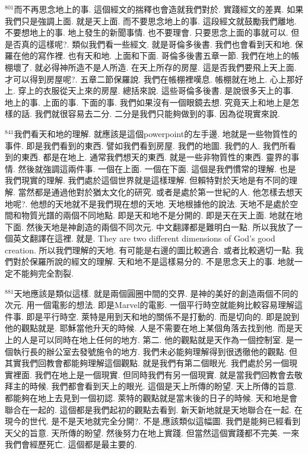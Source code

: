 \documentclass{book}
\begin{document}
$^{801}$而不再思念地上的事.
這個經文的揣釋也會造就我們對於.
實踐經文的差異.
如果我們只是強調上面.
就是天上面.
而不要思念地上的事.
這段經文就鼓勵我們離地.
不要想地上的事.
地上發生的新聞事情.
也不要理會.
只要思念上面的事就可以.
但是否真的這樣呢?.
類似我們看一些經文.
就是哥倫多後書.
我們也會看到天和地.
保羅在他的寫作裡.
也有天和地.
上面和下面.
哥倫多後書五章一節.
我們在地上的帳棚壞了.
就必得神所造不是人所造.
在天上所存的房屋.
這是否我們要飛上天上面.
才可以得到房屋呢?.
五章二節保羅說.
我們在帳棚裡嘆息.
帳棚就在地上.
心上那好上.
穿上的衣服從天上來的房屋.
總括來說.
這些哥倫多後書.
是說很多天上的事.
地上的事.
上面的事.
下面的事.
我們如果沒有一個眼鏡去想.
究竟天上和地上是怎樣的話.
我們就很容易去二分.
二分是我們只能夠做到的事.
因為從現實來說.

$^{841}$我們看天和地的理解.
就應該是這個powerpoint的左手邊.
地就是一些物質性的事件.
即是我們看到的東西.
譬如我們看到房屋.
我們的地圖.
我們的人.
我們所看到的東西.
都是在地上.
通常我們想天的東西.
就是一些非物質性的東西.
靈界的事情.
然後就強調這兩件事.
一個在上面.
一個在下面.
這個是我們慣常的理解.
也是我們現實的理解.
我們處於這個世界就是這樣理解.
但賴特對於天地是有不同的理解.
當然都是通過他對於猶太文化的研究.
或者是處於第一世紀的人.
他怎樣去想天地呢?.
他想的天地就不是我們現在想的天地.
天地根據他的說法.
天地不是處於空間和物質光譜的兩個不同地點.
即是天和地不是分開的.
即是天在天上面.
地就在地下面.
然後天地是神創造的兩個不同次元.
中文翻譯都是難明白一點.
所以我放了一個英文翻譯在這裡.
就是.
They are two different dimensions of God's good creation.
所以我們理解的天地.
有可能是右邊的圖比較適合.
或者比較適切一點.
我們對於保羅所說的經文的理解.
天和地不是這樣易分的.
不是思念天上的事.
地就一定不能夠完全割裂.

$^{881}$天地應該是類似這樣.
就是兩個圓圈中間的交界.
是神的美好的創造兩個不同的次元.
用一個電影的想法.
即是Marvel的電影.
一個平行時空就能夠比較容易理解這件事.
即是平行時空.
萊特是用到天和地的關係不是打動的.
而是切向的.
即是說到他的觀點就是.
耶穌當他升天的時候.
人是不需要在地上某個角落去找到他.
而是天上的人是可以同時在地上任何的地方.
第二.
他的觀點就是天作為一個控制室.
是一個執行長的辦公室去發號施令的地方.
我們未必能夠理解得到很透徹他的觀點.
但其實我們回教會都能夠理解這個觀點.
就是我們有第二個眼光.
我們處於另一個現實裡面.
我們在地上是一個現實.
但同時我們有另一個現實.
就是當我們回教會去敬拜主的時候.
我們都會看到天上的眼光.
這個是天上所傳的盼望.
天上所傳的旨意.
都能夠在地上去見到一個初認.
萊特的觀點就是當末後的日子的時候.
天和地是會聯合在一起的.
這個都是我們起初的觀點去看到.
新天新地就是天地聯合在一起.
在現今的世代.
是不是天地就完全分開?.
不是,應該類似這幅圖.
我們是能夠已經看到天父的旨意.
天所傳的盼望.
然後努力在地上實踐.
但當然這個實踐都不完美.
一來我們會經歷死亡.
這個都是最主要的.
\end{document}
